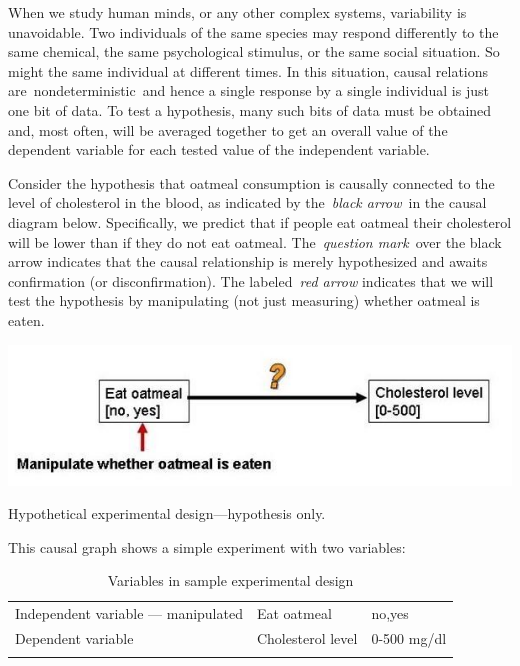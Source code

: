\begin{refsection}
When we study human minds, or any other complex systems, variability is unavoidable. Two individuals of the same species may respond differently to the same chemical, the same psychological stimulus, or the same social situation. So might the same individual at different times. In this situation, causal relations are nondeterministic and hence a single response by a single individual is just one bit of data. To test a hypothesis, many such bits of data must be obtained and, most often, will be averaged together to get an overall value of the dependent variable for each tested value of the independent variable.

Consider the hypothesis that oatmeal consumption is causally connected to the level of cholesterol in the blood, as indicated by the \emph{black arrow} in the causal diagram below. Specifically, we predict that if people eat oatmeal their cholesterol will be lower than if they do not eat oatmeal. The \emph{question mark} over the black arrow indicates that the causal relationship is merely hypothesized and awaits confirmation (or disconfirmation). The labeled \emph{red arrow} indicates that we will test the hypothesis by manipulating (not just measuring) whether oatmeal is eaten.

\begin{marginfigure}
 \begin{center}

  \includegraphics{../images/cholesterolcausaldiagram1.jpg}
\end{center}
 \caption{Hypothetical experimental design---hypothesis only.}
\label{fig: cholestrol1}
\end{marginfigure}


This causal graph shows a simple experiment with two variables:
 \begin{longtable}[!t]{ | P{4cm} | P{3cm} | P{1.5cm} | }
\hline
{}&& \\ \hline
Independent variable --- manipulated&Eat oatmeal&no,yes \\ \hline
Dependent variable&Cholesterol level&0-500 mg/dl \\ \hline
\caption{Variables in sample experimental design}
\label{table: variables}
\end{longtable}



\end{refsection}
